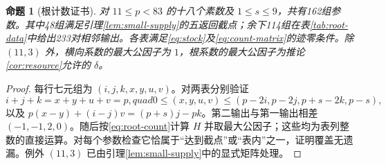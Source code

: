 \documentclass[11pt,a4paper]{article}
\newtheorem{proposition}[theorem]{命题}
\theoremstyle{definition}
\numberwithin{equation}{section}
\begin{document}
\begin{proposition}[根计数证书]\label{prop:root-certificate}
对 $11\le p<83$ 的十八个素数及 $1\le s\le9$，共有162组参数。其中48组满足引理\ref{lem:small-supply}的五返回截点；余下114组在表\ref{tab:root-data}中给出233对相邻输出。各表满足\eqref{eq:stock}及\eqref{eq:count-matrix}的迹零条件。除 $(11,3)$ 外，横向系数的最大公因子为 $1$，根系数的最大公因子为推论\ref{cor:resource}允许的 $\delta$。
\end{proposition}
\begin{proof}
每行七元组为 $(i,j,k,x,y,u,v)$。对两表分别验证
\[
i+j+k=x+y+u+v=p,quad
0\le(x,y,u,v)\le(p-2i,p-2j,p+s-2k,p-s),
\]
以及 $p(x-y)+(i-j)v=(p+s)j-pk$。第二输出与第一输出相差 $(-1,-1,2,0)$。随后按\eqref{eq:root-count}计算 $H$ 并取最大公因子；这些均为表列整数的直接运算。对每个参数检查它恰属于“达到截点”或“表内”之一，证明覆盖无遗漏。例外 $(11,3)$ 已由引理\ref{lem:small-supply}中的显式矩阵处理。
\end{proof}
\end{document}
